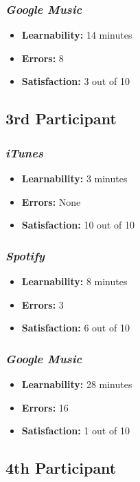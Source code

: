 \documentclass{article}
\begin{document}
{\begin{multicols}{2}
\subsubsection{\it Google Music}
\begin{itemize}
\item {\bf Learnability:} 14 minutes
	\item {\bf Errors:} 8
	\item {\bf Satisfaction:} 3 out of 10 
\end{itemize}

\subsection{3rd Participant}

\subsubsection{\it iTunes}
\begin{itemize}
	\item {\bf Learnability:} 3 minutes
	\item {\bf Errors:}  None
	\item {\bf Satisfaction:} 10 out of 10 
\end{itemize}

\subsubsection{\it Spotify}
\begin{itemize}
	\item {\bf Learnability:} 8 minutes
	\item {\bf Errors:} 3
	\item {\bf Satisfaction:} 6 out of 10 
\end{itemize}

\subsubsection{\it Google Music}
\begin{itemize}
\item {\bf Learnability:} 28 minutes
	\item {\bf Errors:} 16
	\item {\bf Satisfaction:} 1 out of 10 
\end{itemize}

\subsection{4th Participant}


\end{multicols}}
\end{document}
